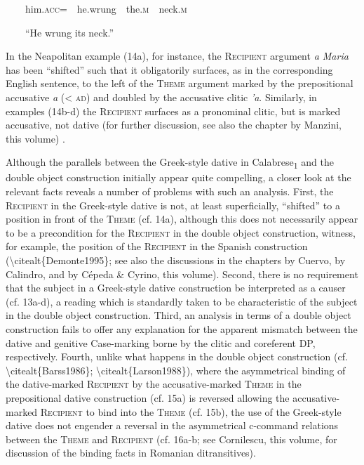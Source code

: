 \documentclass[output=paper,modfonts,nonflat]{langsci/langscibook}
\begin{document}
\begin{styleStandard}
\ \ \ \ him.\textsc{acc}=\ \ he.wrung\ \ the.\textsc{m\ \ }neck.\textsc{m}
\end{styleStandard}

\begin{styleStandard}
\ \ \ \ “He wrung its neck.”
\end{styleStandard}

\begin{styleStandard}
In the Neapolitan example (14a), for instance, the \textsc{Recipient} argument \textit{a Maria }has been “shifted” such that it obligatorily surfaces, as in the corresponding English sentence, to the left of the \textsc{Theme} argument marked by the prepositional accusative \textit{a }({\textless} \textsc{ad}) and doubled by the accusative clitic \textit{’a}. Similarly, in examples (14b-d) the \textsc{Recipient} surfaces as a pronominal clitic, but is marked accusative, not dative (for further discussion, see also the chapter by Manzini, this volume) .
\end{styleStandard}

\begin{styleStandard}
Although the parallels between the Greek-style dative in Calabrese\textsubscript{1} and the double object construction initially appear quite compelling, a closer look at the relevant facts reveals a number of problems with such an analysis. First, the \textsc{Recipient} in the Greek-style dative is not, at least superficially, “shifted” to a position in front of the \textsc{Theme }(cf. 14a), although this does not necessarily appear to be a precondition for the \textsc{Recipient} in the double object construction, witness, for example, the position of the \textsc{Recipient} in the Spanish construction ({\textbackslash}citealt\{Demonte1995\}; see also the discussions in the chapters by Cuervo, by Calindro, and by Cépeda \& Cyrino, this volume). Second, there is no requirement that the subject in a Greek-style dative construction be interpreted as a causer (cf. 13a-d), a reading which is standardly taken to be characteristic of the subject in the double object construction. Third, an analysis in terms of a double object construction fails to offer any explanation for the apparent mismatch between the dative and genitive Case-marking borne by the clitic and coreferent DP, respectively. Fourth, unlike what happens in the double object construction (cf. {\textbackslash}citealt\{Barss1986\}; {\textbackslash}citealt\{Larson1988\}), where the asymmetrical binding of the dative-marked \textsc{Recipient} by the accusative-marked \textsc{Theme} in the prepositional dative construction (cf. 15a) is reversed allowing the accusative-marked \textsc{Recipient} to bind into the \textsc{Theme} (cf. 15b), the use of the Greek-style dative does not engender a reversal in the asymmetrical c-command relations between the \textsc{Theme} and \textsc{Recipient }(cf. 16a-b; see Cornilescu, this volume, for discussion of the binding facts in Romanian ditransitives).
\end{styleStandard}
\end{document}
